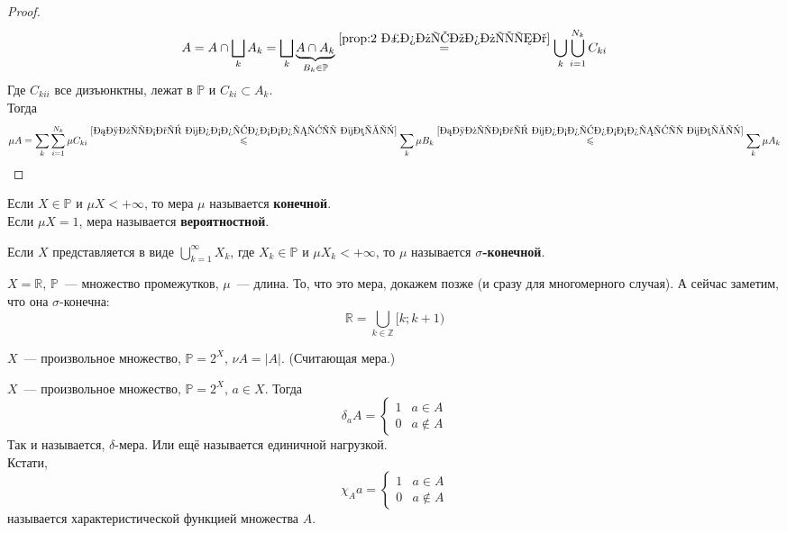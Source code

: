 \documentclass{article}
\begin{document}
    \begin{proof}
        $$
        A=A\cap\bigsqcup_kA_k=\bigsqcup_k\underbrace{A\cap A_k}_{B_k\in\mathbb P}\overset{\ref{prop:2 полукольца}}=\bigcup\limits_k\bigcup\limits_{i=1}^{N_k}C_{ki}
        $$
        Где $C_{kii}$ все дизъюнктны, лежат в $\mathbb P$ и $C_{ki}\subset A_k$.\\
        Тогда
        $$
        \mu A=\sum\limits_k\sum\limits_{i=1}^{N_k}\mu C_{ki}\overset{\ref{Сильная монотонность меры}}\leqslant\sum\limits_k\mu B_k\overset{\ref{Сильная монотонность меры}}\leqslant\sum\limits_k\mu A_k
        $$
    \end{proof}
    \begin{definition}
        Если $X\in\mathbb P$ и $\mu X<+\infty$, то мера $\mu$ называется \textbf{конечной}.\\
        Если $\mu X=1$, мера называется \textbf{вероятностной}.
    \end{definition}
    \begin{definition}
        Если $X$ представляется в виде $\bigcup\limits_{k=1}^\infty X_k$, где $X_k\in\mathbb P$ и $\mu X_k<+\infty$, то $\mu$ называется \textbf{$\sigma$-конечной}.
    \end{definition}
    \begin{example}
        $X=\mathbb R$, $\mathbb P$~--- множество промежутков, $\mu$~--- длина. То, что это мера, докажем позже (и сразу для многомерного случая). А сейчас заметим, что она $\sigma$-конечна:
        $$
        \mathbb R=\bigcup\limits_{k\in\mathbb Z}[k;k+1)
        $$
    \end{example}
    \begin{example}
        $X$~--- произвольное множество, $\mathbb P=2^X$, $\nu A=|A|$. (Считающая мера.)
    \end{example}
    \begin{example}
        $X$~--- произвольное множество, $\mathbb P=2^X$, $a\in X$. Тогда
        $$
        \delta_a A=\begin{cases}
            1&a\in A\\
            0&a\notin A
        \end{cases}
        $$
        Так и называется, $\delta$-мера. Или ещё называется единичной нагрузкой.\\
        Кстати,
        $$
        \chi_A a=\begin{cases}
            1&a\in A\\
            0&a\notin A
        \end{cases}
        $$
        называется характеристической функцией множества $A$.
    \end{example}
\end{document}
